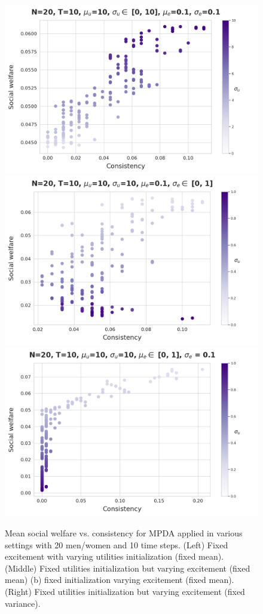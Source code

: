 \begin{figure}
    \centering
    \includegraphics[width=0.32\linewidth]{figures/mpda_dynamics_initliazation.png}
    \includegraphics[width=0.32\linewidth]{figures/mpda_dynamics_excitement_std.png}
    \includegraphics[width=0.32\linewidth]{figures/mpda_dynamics_excitement_mean.png}
     \caption{Mean social welfare vs. consistency for MPDA applied in various settings with 20 men/women and 10 time steps. (Left) Fixed excitement with varying utilities initialization (fixed mean). (Middle) Fixed utilities initialization but varying excitement (fixed mean) (b) fixed initialization varying excitement (fixed mean). (Right) Fixed utilities initialization but varying excitement (fixed variance).}
    \label{fig:mpda_dynamics}
\end{figure}